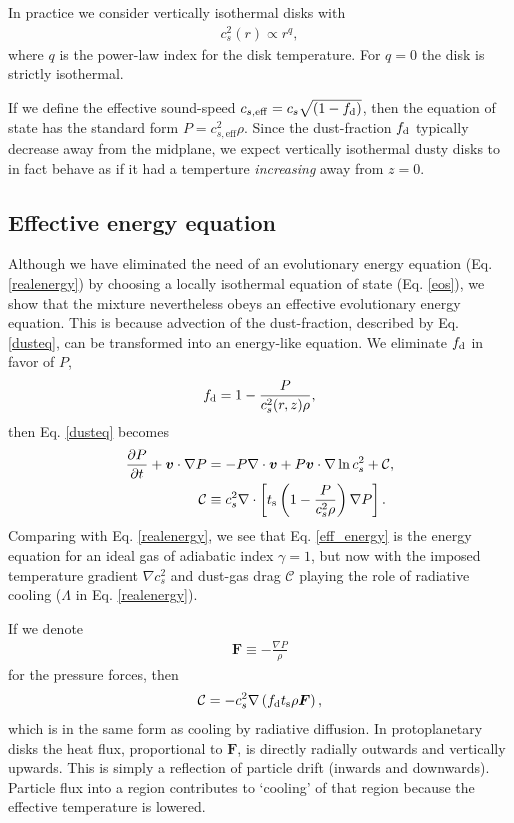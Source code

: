 In practice we consider vertically 
isothermal disks with \begin{align}\label{power_temp}
  c_s^2(r) \propto r^{q},
\end{align}
where $q$ is the power-law index for the disk temperature. For $q=0$
the disk is strictly isothermal. 

If we define the effective sound-speed $c_{s,\mathrm{eff}} = c_s\sqrt{\left(1 -
    f_\mathrm{d}\right)}$, then the equation of state has the standard
form $P=c_{s,\mathrm{eff}}^2\rho$. Since the dust-fraction $f_\mathrm{d}$
typically decrease away from the midplane, we expect vertically
isothermal dusty disks to in fact behave as if it
had a temperture \emph{increasing} away from $z=0$.   

\subsection{Effective energy equation}
Although we have eliminated the need of an evolutionary energy
equation (Eq. \ref{realenergy}) by choosing a locally isothermal
equation of state (Eq. \ref{eos}), we show that the mixture 
nevertheless obeys an effective evolutionary energy equation. This is
because advection of the dust-fraction, described by
Eq. \ref{dusteq}, can be transformed into an energy-like 
equation. We 
eliminate $f_\mathrm{d}$ in favor of $P$, 
\begin{align*}
  f_\mathrm{d} = 1 - \frac{P}{c_s^2(r,z)\rho}, 
\end{align*}
then Eq. \ref{dusteq} becomes
\begin{align}
\frac{\partial P}{\partial t} + \bm{v}\cdot\nabla P  
&= - P \nabla\cdot\bm{v} + P\bm{v}\cdot\nabla\ln{c_s^2}
                + \mathcal{C},  \label{eff_energy} \\
\mathcal{C}&\equiv c_s^2 \nabla\cdot\left[t_\mathrm{s}\left(1 -
  \frac{P}{c_s^2\rho}\right)\nabla 
  P\right].
\end{align}
Comparing with Eq. \ref{realenergy}, we see that 
Eq. \ref{eff_energy} is the energy equation for an ideal gas of
adiabatic index $\gamma=1$, but now with the imposed temperature
gradient $\nabla c_s^2$ and dust-gas drag $\mathcal{C}$ playing the
role of radiative cooling ($\Lambda$ in 
Eq. \ref{realenergy}). 

If we denote 
\begin{align}
  \bm{F} \equiv  - \frac{\nabla P}{\rho}
\end{align}
for the pressure forces, then
\begin{align*}
  \mathcal{C} = - c_s^2\nabla \left( f_\mathrm{d} t_\mathrm{s} \rho \bm{F}
  \right), 
\end{align*}
which is in the same form as cooling by radiative diffusion. In protoplanetary
disks the heat flux, proportional to $\bm{F}$, is directly radially
outwards and vertically upwards. This is simply a reflection of
particle drift (inwards and downwards). Particle flux into a region contributes
to `cooling' of that region because the effective temperature is
lowered. 

